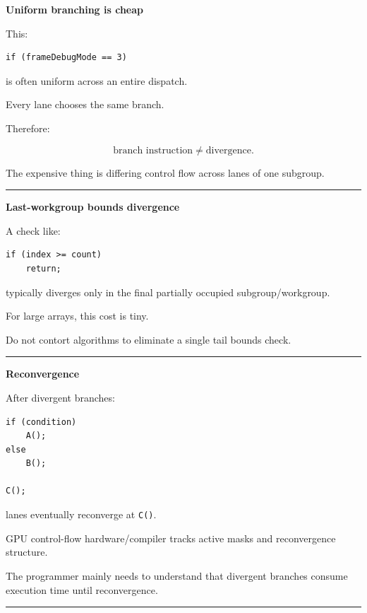 \textbf{Uniform branching is cheap}

This:

\protect{}\label{3mrjt7}%
\begin{verbatim}
if (frameDebugMode == 3)
\end{verbatim}

is often uniform across an entire dispatch.

Every lane chooses the same branch.

Therefore:

\[
\boxed{
\text{branch instruction}
\neq
\text{divergence}.
}
\]

The expensive thing is differing control flow across lanes of one subgroup.

\begin{center}\rule{0.5\linewidth}{0.5pt}\end{center}

\textbf{Last-workgroup bounds divergence}

A check like:

\protect{}\label{jynsrg}%
\begin{verbatim}
if (index >= count)
    return;
\end{verbatim}

typically diverges only in the final partially occupied subgroup/workgroup.

For large arrays, this cost is tiny.

Do not contort algorithms to eliminate a single tail bounds check.

\begin{center}\rule{0.5\linewidth}{0.5pt}\end{center}

\textbf{Reconvergence}

After divergent branches:

\protect{}\label{x2i0x6}%
\begin{verbatim}
if (condition)
    A();
else
    B();

C();
\end{verbatim}

lanes eventually reconverge at \texttt{C()}.

GPU control-flow hardware/compiler tracks active masks and reconvergence structure.

The programmer mainly needs to understand that divergent branches consume execution time until reconvergence.

\begin{center}\rule{0.5\linewidth}{0.5pt}\end{center}

